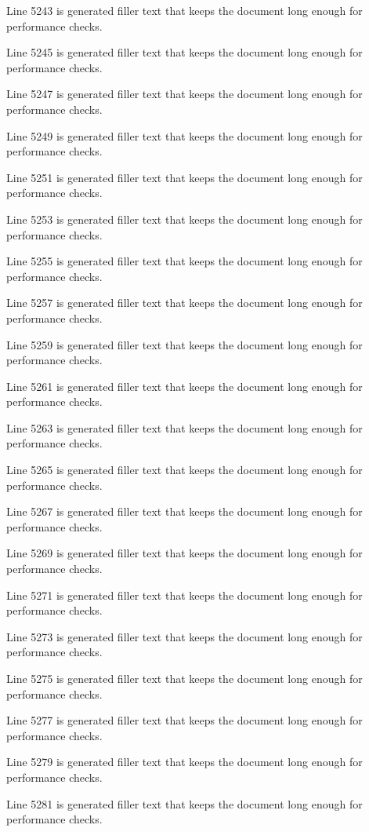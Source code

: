 Line 5243 is generated filler text that keeps the document long enough for performance checks.

Line 5245 is generated filler text that keeps the document long enough for performance checks.

Line 5247 is generated filler text that keeps the document long enough for performance checks.

Line 5249 is generated filler text that keeps the document long enough for performance checks.

Line 5251 is generated filler text that keeps the document long enough for performance checks.

Line 5253 is generated filler text that keeps the document long enough for performance checks.

Line 5255 is generated filler text that keeps the document long enough for performance checks.

Line 5257 is generated filler text that keeps the document long enough for performance checks.

Line 5259 is generated filler text that keeps the document long enough for performance checks.

Line 5261 is generated filler text that keeps the document long enough for performance checks.

Line 5263 is generated filler text that keeps the document long enough for performance checks.

Line 5265 is generated filler text that keeps the document long enough for performance checks.

Line 5267 is generated filler text that keeps the document long enough for performance checks.

Line 5269 is generated filler text that keeps the document long enough for performance checks.

Line 5271 is generated filler text that keeps the document long enough for performance checks.

Line 5273 is generated filler text that keeps the document long enough for performance checks.

Line 5275 is generated filler text that keeps the document long enough for performance checks.

Line 5277 is generated filler text that keeps the document long enough for performance checks.

Line 5279 is generated filler text that keeps the document long enough for performance checks.

Line 5281 is generated filler text that keeps the document long enough for performance checks.


